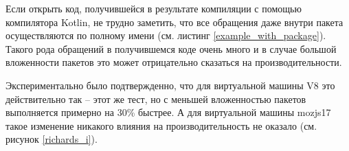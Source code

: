 Если открыть код, получившейся в результате компиляции с помощью компилятора Kotlin, не трудно заметить, что все обращения даже внутри пакета осуществляются по полному имени (см. листинг \ref{example_with_package}). Такого рода обращений в получившемся коде очень много и в случае большой вложенности пакетов это может отрицательно сказаться на производительности. 

\begin{code}
\begin{JavaScript}[caption=Пример код с обращением по полному имени внутри того же пакета, label=example_with_package]
...
_ = {
org: Kotlin.definePackage({
  jetbrains: Kotlin.definePackage({
    kotlin: Kotlin.definePackage({
      benchmarks: Kotlin.definePackage({
        Richards_from_darts: Kotlin.definePackage({
          js: Kotlin.definePackage({
            //...
            addIdleTask: function (id, priority, queue, count) {
            this.addRunningTask(id, priority, queue, new _.org.jetbrains.kotlin.benchmarks.Richards.js.IdleTask(this, 1, count));
            }
            //...
\end{JavaScript}
\end{code}

Экспериментально было подтвержденно, что для виртуальной машины V8 это действительно так -- этот же тест, но с меньшей вложенностью пакетов выполняется примерно на 30\% быстрее. А для виртуальной машины mozjs17 такое изменение никакого влияния на производительность не оказало (см. рисунок \ref{richards_i}).

